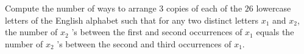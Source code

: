 Compute the number of ways to arrange $3$ copies of each of the $26$ lowercase letters of the English alphabet such that for any two distinct letters $x_{1}$ and $x_{2}$, the number of $x_{2}$ 's between the first and second occurrences of $x_{1}$ equals the number of $x_{2}$ 's between the second and third occurrences of $x_{1}$.